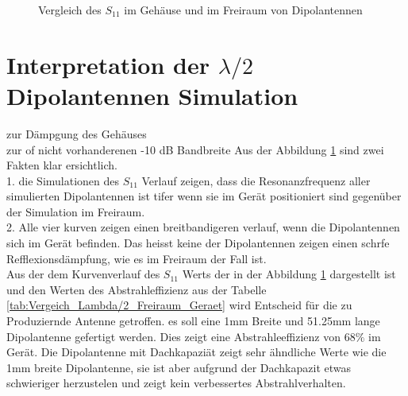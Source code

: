 \begin{figure}[!ht]
	\centering
	\begingroup
	
	\endgroup
	\caption{Vergleich des $S_{11}$ im Gehäuse und im Freiraum von Dipolantennen }	\label{S11_Vergleich_Simulation_Dipolantenn_freiraum_Geraet}
\end{figure}


\newpage
\section{Interpretation der $\lambda/2$ Dipolantennen Simulation}\label{sec:Interpretation_Dipol}

zur Dämpgung des Gehäuses\\
zur of nicht vorhanderenen -10 dB Bandbreite
Aus der Abbildung \ref{S11_Vergleich_Simulation_Dipolantenn_freiraum_Geraet} sind zwei Fakten klar ersichtlich. \\
1. die Simulationen des $S_{11}$ Verlauf zeigen, dass die Resonanzfrequenz aller simulierten Dipolantennen ist tifer wenn sie im Gerät positioniert sind gegenüber der Simulation im Freiraum.\\
2. Alle vier kurven zeigen einen breitbandigeren verlauf, wenn die Dipolantennen sich im Gerät befinden. Das heisst keine der Dipolantennen zeigen einen schrfe Refflexionsdämpfung, wie es im Freiraum der Fall ist. \\
Aus der dem Kurvenverlauf des $S_{11}$ Werts der in der Abbildung \ref{S11_Vergleich_Simulation_Dipolantenn_freiraum_Geraet} dargestellt ist und den Werten des Abstrahleffizienz aus der Tabelle \ref{tab:Vergeich_Lambda/2_Freiraum_Geraet} wird Entscheid für die zu Produziernde Antenne getroffen. es soll eine 1mm Breite und 51.25mm lange Dipolantenne gefertigt werden. Dies zeigt eine Abstrahleeffizienz von 68$\%$ im Gerät. Die Dipolantenne mit Dachkapaziät zeigt sehr ähndliche Werte wie die 1mm breite Dipolantenne, sie ist aber aufgrund der Dachkapazit etwas schwieriger herzustelen und zeigt kein verbessertes Abstrahlverhalten.
